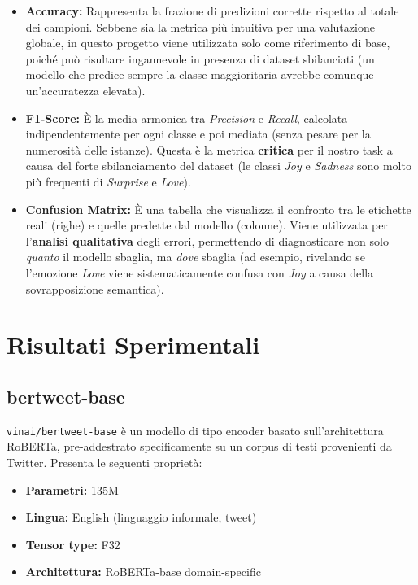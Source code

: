 \documentclass[a4paper,12pt]{article}
\begin{document}
\begin{itemize}
    \item \textbf{Accuracy:} Rappresenta la frazione di predizioni corrette rispetto al totale dei campioni. Sebbene sia la metrica più intuitiva per una valutazione globale, in questo progetto viene utilizzata solo come riferimento di base, poiché può risultare ingannevole in presenza di dataset sbilanciati (un modello che predice sempre la classe maggioritaria avrebbe comunque un'accuratezza elevata).

    \item \textbf{F1-Score:} È la media armonica tra \textit{Precision} e \textit{Recall}, calcolata indipendentemente per ogni classe e poi mediata (senza pesare per la numerosità delle istanze). Questa è la metrica \textbf{critica} per il nostro task a causa del forte sbilanciamento del dataset (le classi \textit{Joy} e \textit{Sadness} sono molto più frequenti di \textit{Surprise} e \textit{Love}).

    \item \textbf{Confusion Matrix:} È una tabella che visualizza il confronto tra le etichette reali (righe) e quelle predette dal modello (colonne). Viene utilizzata per l'\textbf{analisi qualitativa} degli errori, permettendo di diagnosticare non solo \textit{quanto} il modello sbaglia, ma \textit{dove} sbaglia (ad esempio, rivelando se l'emozione \textit{Love} viene sistematicamente confusa con \textit{Joy} a causa della sovrapposizione semantica).
\end{itemize}
\section{Risultati Sperimentali}

\subsection{bertweet-base}

\texttt{vinai/bertweet-base} è un modello di tipo encoder basato sull'architettura RoBERTa,
pre-addestrato specificamente su un corpus di testi provenienti da Twitter. Presenta le seguenti proprietà:

\begin{itemize}
    \item \textbf{Parametri:} 135M
    \item \textbf{Lingua:} English (linguaggio informale, tweet)
    \item \textbf{Tensor type:} F32
    \item \textbf{Architettura:} RoBERTa-base domain-specific
\end{itemize}
\end{document}
